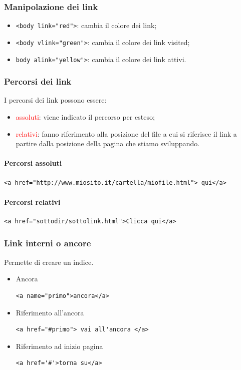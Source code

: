 \documentclass{article}
\begin{document}
\subsubsection{Manipolazione dei link}
\begin{itemize}
    \item \texttt{<body link="red">}: cambia il colore dei link;
    \item \texttt{<body vlink="green">}: cambia il colore dei link visited;
    \item \texttt{body alink="yellow">}: cambia il colore dei link attivi.
\end{itemize}
\subsubsection{Percorsi dei link}
I percorsi dei link possono essere:
\begin{itemize}
    \item \textcolor{red}{assoluti}: viene indicato il percorso per esteso;
    \item \textcolor{red}{relativi}: fanno riferimento alla posizione del file a cui si riferisce il link a partire dalla posizione della pagina che stiamo sviluppando.
\end{itemize}
\paragraph{Percorsi assoluti} \mbox{}
\begin{lstlisting}[style=htmlstyle]
<a href="http://www.miosito.it/cartella/miofile.html"> qui</a>
\end{lstlisting}
\paragraph{Percorsi relativi} \mbox{}
\begin{lstlisting}[style=htmlstyle]
<a href="sottodir/sottolink.html">Clicca qui</a>
\end{lstlisting}
\pagebreak
\subsubsection{Link interni o ancore}
Permette di creare un indice.
\begin{itemize}
    \item Ancora
    \begin{lstlisting}[style=htmlstyle]
    <a name="primo">ancora</a>
    \end{lstlisting}
    \item Riferimento all'ancora
    \begin{lstlisting}[style=htmlstyle]
    <a href="#primo"> vai all'ancora </a>
    \end{lstlisting}
    \item Riferimento ad inizio pagina
    \begin{lstlisting}[style=htmlstyle]
    <a href='#'>torna su</a>
    \end{lstlisting}
\end{itemize}
\end{document}
